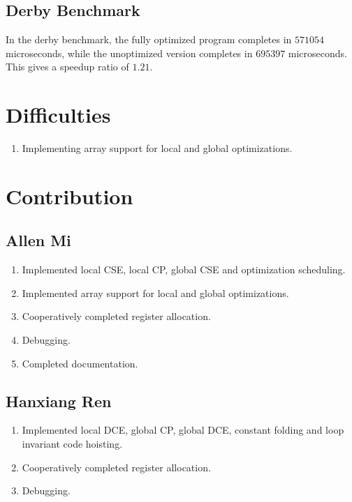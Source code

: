 \subsection{Derby Benchmark}
In the derby benchmark, the fully optimized program completes in $571054$ microseconds, while the unoptimized version completes in $695397$ microseconds. This gives a speedup ratio of $1.21$.

\section{Difficulties}
\begin{enumerate}
    \item Implementing array support for local and global optimizations.
\end{enumerate}

\section{Contribution}

\subsection{Allen Mi}
\begin{enumerate}
    \item Implemented local CSE, local CP, global CSE and optimization scheduling.
    \item Implemented array support for local and global optimizations.
    \item Cooperatively completed register allocation.
    \item Debugging.
    \item Completed documentation.
\end{enumerate}

\subsection{Hanxiang Ren}
\begin{enumerate}
    \item Implemented local DCE, global CP, global DCE, constant folding and loop invariant code hoisting.
    \item Cooperatively completed register allocation.
    \item Debugging.
\end{enumerate}